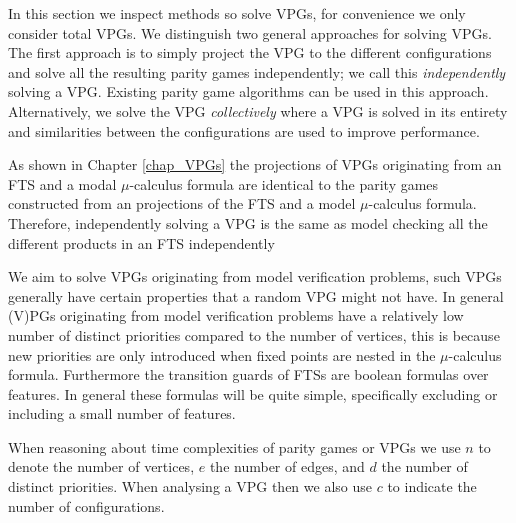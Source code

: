 In this section we inspect methods so solve VPGs, for convenience we only consider total VPGs. We distinguish two general approaches for solving VPGs. The first approach is to simply project the VPG to the different configurations and solve all the resulting parity games independently; we call this \textit{independently} solving a VPG. Existing parity game algorithms can be used in this approach. Alternatively, we solve the VPG \textit{collectively} where a VPG is solved in its entirety and similarities between the configurations are used to improve performance.

As shown in Chapter \ref{chap_VPGs} the projections of VPGs originating from an FTS and a modal $\mu$-calculus formula are identical to the parity games constructed from an projections of the FTS and a model $\mu$-calculus formula. Therefore, independently solving a VPG is the same as model checking all the different products in an FTS independently

We aim to solve VPGs originating from model verification problems, such VPGs generally have certain properties that a random VPG might not have. In general (V)PGs originating from model verification problems have a relatively low number of distinct priorities compared to the number of vertices, this is because new priorities are only introduced when fixed points are nested in the $\mu$-calculus formula. Furthermore the transition guards of FTSs are boolean formulas over features. In general these formulas will be quite simple, specifically excluding or including a small number of features.

When reasoning about time complexities of parity games or VPGs we use $n$ to denote the number of vertices, $e$ the number of edges, and $d$ the number of distinct priorities. When analysing a VPG then we also use $c$ to indicate the number of configurations.